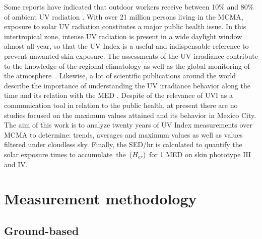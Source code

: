 \documentclass{article}
\begin{document}
Some reports have indicated that outdoor workers receive between 10\%
and 80\% of ambient UV radiation \cite{Larko1983,Makgabutlane_2015,Silva_2016,Moldovan_2020}. With over 21
million persons living in the MCMA, exposure to solar UV radiation
constitutes a major public health issue. In this intertropical zone,
intense UV radiation is present in a wide daylight window almost all
year, so that the UV Index is a useful and indispensable reference to
prevent unwanted skin exposure. The assessments of the UV irradiance
contribute to the knowledge of the regional climatology as well as the
global monitoring of the atmosphere~\cite{Madronich_1993,Fioletov_2004,Staiger_2005,Luccini_2006,Herman_2010,Bech_2014,Utrillas_2018}. Likewise, a lot
of scientific publications around the world describe the importance of
understanding the UV irradiance behavior along the time and its relation
with the MED \cite{Calaf_2011,RIVAS_2015,Lehmann_2019,Parra_2019,Cadet_2019}. Despite of the relevance of UVI as a
communication tool in relation to the public health, at present there
are no studies focused on the maximum values attained and its behavior
in Mexico City. The aim of this work is to analyze twenty years of UV
Index measurements over MCMA to determine: trends, averages and maximum
values as well as values filtered under cloudless sky. Finally, the
SED/hr is calculated to quantify the solar exposure times to
accumulate~the~(\(H_{er}\))~for 1 MED on skin phototype III and
IV.

\section*{Measurement methodology}

{\label{321063}}

\subsection*{Ground-based~}

{\label{339070}}
\end{document}
